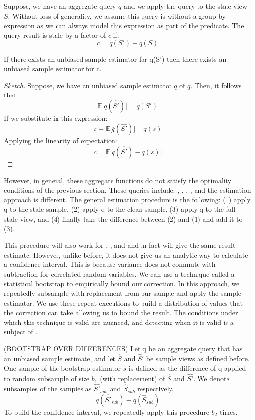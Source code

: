 Suppose, we have an aggregate query $q$ and we apply the query to the stale view $S$.
Without loss of generality, we assume this query is without a group by expression as we can always model this expression as part of the predicate.
The query result is stale by a factor of $c$ if:
\[ c = q(S') - q(S)\] 

\begin{lemma}\label{lemma:unbiased}
If there exists an unbiased sample estimator for q(S') then there exists an unbiased sample estimator for c.
\end{lemma}

\begin{proof}[Sketch] Suppose, we have an unbiased sample estimator $\bar{q}$ of $q$. 
Then, it follows that \[\mathbb{E}\big[\bar{q}(\hat{S'})\big] = q(S')\]
If we substitute in this expression:
\[ c = \mathbb{E}\big[\bar{q}(\hat{S'})\big] -q(s) \] 
Applying the linearity of expectation:
\[ c = \mathbb{E}\big[\bar{q}(\hat{S'}) - q(s)\big] \]
\end{proof}

However, in general, these aggregate functions do not satisfy the optimality conditions of the previous section.
These queries include: \histfunc, \corrfunc, \varfunc, \covfunc, and the estimation approach is different.
The general estimation procedure is the following: (1) apply q to the stale sample, (2) apply q to the clean sample, (3) apply q to the full stale view, and (4) finally take the difference between (2) and (1) and add it to (3). 

This procedure will also work for \sumfunc, \countfunc, and \avgfunc and in fact will give the same result estimate.
However, unlike before, it does not give us an analytic way to calculate a confidence interval.
This is because variance does not commute with subtraction for correlated random variables.
We can use a technique called a statistical bootstrap \cite{AgarwalMPMMS13} to empirically bound our correction.
In this approach, we repeatedly subsample with replacement from our sample and apply the sample estimator.
We use these repeat executions to build a distribution of values that the correction can take allowing us to bound the result.
The conditions under which this technique is valid are nuanced, and detecting when it is valid is a subject of \cite{agarwalknowing}.

\begin{proposition} (BOOTSTRAP OVER DIFFERENCES) Let q be an aggregate query that has an unbiased sample estimate, and let $\hat{S}$ and $\hat{S'}$ be sample views as defined before. 
One sample of the bootstrap estimator $s$ is defined as the difference of q applied to random subsample of size $b_1$ (with replacement) of $\hat{S}$ and $\hat{S'}$.
We denote subsamples of the samples as $\hat{S'}_{sub}$ and $\hat{S}_{sub}$ respectively.
\[q(\hat{S'}_{sub}) - q(\hat{S}_{sub})\]
To build the confidence interval, we repeatedly apply this procedure $b_2$ times.
\end{proposition}

